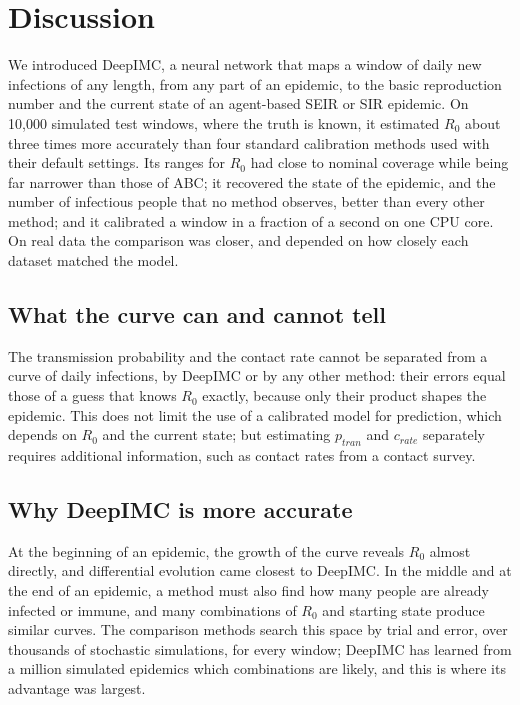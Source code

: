 \documentclass[12pt]{article}
\begin{document}
\section{Discussion}\label{sec:discussion}

We introduced DeepIMC, a neural network that maps a window of daily new infections of any length, from
any part of an epidemic, to the basic reproduction number and the current state of an agent-based SEIR or
SIR epidemic. On 10,000 simulated test windows, where the truth is known, it estimated $R_0$ about three
times more accurately than four standard calibration methods used with their default settings. Its ranges
for $R_0$ had close to nominal coverage while being far narrower than those of ABC; it recovered the state of
the epidemic, and the number of infectious people that no method observes, better than every other method;
and it calibrated a window in a fraction of a second on one CPU core. On real data the comparison was closer,
and depended on how closely each dataset matched the model.

\subsection{What the curve can and cannot tell}

The transmission probability and the contact rate cannot be separated from a curve of daily
infections, by DeepIMC or by any other method: their errors equal those of a guess that knows $R_0$
exactly, because only their product shapes the epidemic. This does not limit the use of a calibrated
model for prediction, which depends on $R_0$ and the current state; but estimating $p_{tran}$ and
$c_{rate}$ separately requires additional information, such as contact rates from a contact survey.

\subsection{Why DeepIMC is more accurate}

At the beginning of an epidemic, the growth of the curve reveals $R_0$ almost directly, and differential
evolution came closest to DeepIMC. In the middle and at the end of an epidemic, a method must also find
how many people are already infected or immune, and many combinations of $R_0$ and starting state produce
similar curves. The comparison methods search this space by trial and error, over thousands of stochastic
simulations, for every window; DeepIMC has learned from a million simulated epidemics which combinations are
likely, and this is where its advantage was largest.
\end{document}
